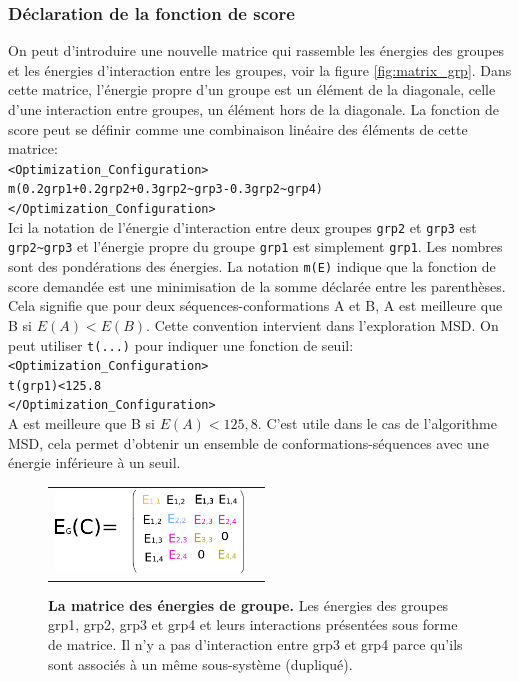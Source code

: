 \subsubsection{Déclaration de la fonction de score}
\label{sub:score}
On peut d'introduire une nouvelle matrice qui rassemble les énergies des groupes et les énergies d'interaction entre les groupes, voir la figure \ref{fig:matrix_grp}. Dans cette matrice, l'énergie propre d'un groupe est un élément de la diagonale, celle d'une interaction entre groupes, un élément hors de la diagonale. La fonction de score peut se définir comme une combinaison linéaire des éléments de cette matrice:\\
\verb!<Optimization_Configuration>! \\
\verb!m(0.2grp1+0.2grp2+0.3grp2~grp3-0.3grp2~grp4)! \\
\verb!</Optimization_Configuration>! \\
Ici la notation de l'énergie d'interaction entre deux groupes \verb!grp2! et \verb!grp3! est \verb!grp2~grp3! et l'énergie propre du groupe \verb!grp1! est simplement \verb!grp1!. Les nombres sont des pondérations des énergies. La notation \verb!m(E)! indique que la fonction de score demandée est une minimisation de la somme déclarée entre les parenthèses. Cela signifie que pour deux séquences-conformations A et B, A est meilleure que B si $E(A) < E(B)$. Cette convention intervient dans l'exploration MSD. On peut utiliser \verb!t(...)! pour indiquer une fonction de seuil:\\
\verb!<Optimization_Configuration>! \\
\verb!t(grp1)<125.8! \\
\verb!</Optimization_Configuration>! \\
A est meilleure que B si $E(A)<125,8$. C'est utile dans le cas de l'algorithme MSD, cela permet d'obtenir un ensemble de conformations-séquences avec une énergie inférieure à un seuil.
\begin{figure}[!htbp]
  \centering
  \begin{tabular}{cc}
    \includegraphics[width=5cm]{figure/group_matrix.png} &
  \end{tabular}
  
  \caption{\textbf{La matrice des énergies de groupe.} Les énergies des groupes grp1, grp2, grp3 et grp4 et leurs interactions présentées sous forme de matrice. Il n'y a pas d'interaction entre grp3 et grp4 parce qu'ils sont associés à un même sous-système (dupliqué).}
  \label{fig:groupmatrix}
\end{figure}

